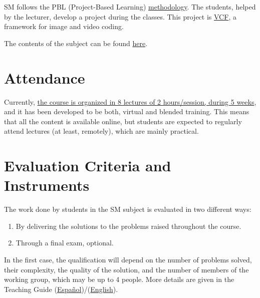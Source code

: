 SM follows the PBL (Project-Based Learning)
\href{http://portafirma.ual.es/pfirma/downloadReport/file?idDocument=4u61Ie5es2&idRequest=ZeBY35LlFa}{methodology}. The
students, helped by the lecturer, develop a project during the
classes. This project is
\href{https://github.com/Sistemas-Multimedia/VCF}{VCF}, a framework
for image and video coding.

The contents of the subject can be found \href{https://sistemas-multimedia.github.io/contents/}{here}.

\section{Attendance}

Currently,
\href{https://www.ual.es/estudios/masteres/presentacion/plandeestudios/asignatura/7114/71142105}{the
  course is organized in 8 lectures of 2 hours/session, during 5
  weeks}, and it has been developed to be both, virtual and
blended training. This means that all the content is available
online, but students are expected to regularly attend lectures (at
least, remotely), which are mainly practical.

\section{Evaluation Criteria and Instruments}

The work done by students in the SM subject is evaluated in two
different ways:

\begin{enumerate}
\item By delivering the solutions to the problems raised throughout
  the course.

\item Through a final exam, optional.
\end{enumerate}

In the first case, the qualification will depend on the number of
problems solved, their complexity, the quality of the solution, and
the number of members of the working group, which may be up to 4
people. More details are given in the Teaching Guide
(\href{https://portafirma.ual.es/pfirma/downloadReport/file?idDocument=BfF99nW06C&idRequest=miB6Ni0U5S}{Español})/(\href{https://portafirma.ual.es/pfirma/downloadReport/file?idDocument=4u61Ie5es2&idRequest=ZeBY35LlFa}{English}).
